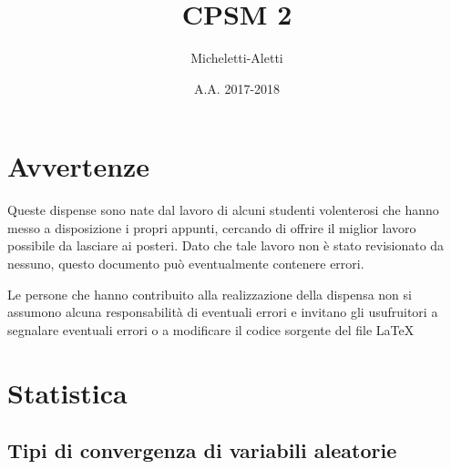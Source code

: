 \documentclass[hidelinks, 10pt]{report}
\author{Micheletti-Aletti}
\date{A.A. 2017-2018}
\title{CPSM 2}
\begin{document}
\newcommand{\defeq}{\vcentcolon=}
\newcommand{\eqdef}{=\vcentcolon}
\providecommand{\ML}[1]{\hat{#1}_{\text{ML}}}
\providecommand{\compl}[1]{\prescript{c}{}{#1}}

\theoremstyle{plain}
\newtheorem{thm}{Teorema}[]

\theoremstyle{definition}
\newtheorem{defn}[]{Definizione}
\newtheorem{prop}[]{Proposizione}
\newtheorem{cor}[]{Corollario}
\newtheorem{lem}[]{Lemma}
\newtheorem{oss}[]{Osservazione}
\newtheorem{nota}[]{Nota}
\newtheorem{es}[]{Esempio}
\newtheorem{ex}[]{Esercizio}

\maketitle
\chapter*{Avvertenze}
Queste dispense sono nate dal lavoro di alcuni studenti volenterosi che hanno messo a disposizione i propri appunti, cercando di offrire il miglior lavoro possibile da lasciare ai posteri. Dato che tale lavoro non \`e stato revisionato da nessuno, questo documento pu\`o eventualmente contenere errori.

Le persone che hanno contribuito alla realizzazione della dispensa non si assumono alcuna responsabilit\`a di eventuali errori e invitano gli usufruitori a segnalare eventuali errori o a modificare il codice sorgente del file \LaTeX


\chapter{Statistica}
\section{Tipi di convergenza di variabili aleatorie}
\end{document}
